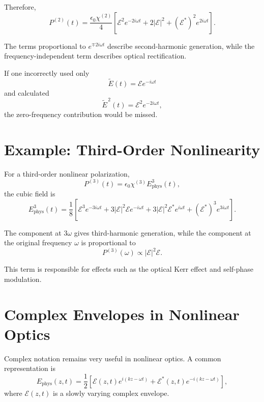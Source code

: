 \documentclass[11pt]{article}
\begin{document}
Therefore,
\begin{equation}
P^{(2)}(t)
=
\frac{\epsilon_0\chi^{(2)}}{4}
\left[
\mathcal{E}^2e^{-2i\omega t}
+
2|\mathcal{E}|^2
+
(\mathcal{E}^{*})^2e^{2i\omega t}
\right].
\end{equation}

The terms proportional to \(e^{\mp 2i\omega t}\) describe second-harmonic generation, while the frequency-independent term describes optical rectification.

If one incorrectly used only
\begin{equation}
\tilde{E}(t)
=
\mathcal{E}e^{-i\omega t}
\end{equation}
and calculated
\begin{equation}
\tilde{E}^{\,2}(t)
=
\mathcal{E}^2e^{-2i\omega t},
\end{equation}
the zero-frequency contribution would be missed.

\section{Example: Third-Order Nonlinearity}

For a third-order nonlinear polarization,
\begin{equation}
P^{(3)}(t)
=
\epsilon_0\chi^{(3)}
E_{\mathrm{phys}}^3(t),
\end{equation}
the cubic field is
\begin{equation}
E_{\mathrm{phys}}^3(t)
=
\frac{1}{8}
\left[
\mathcal{E}^3e^{-3i\omega t}
+
3|\mathcal{E}|^2\mathcal{E}e^{-i\omega t}
+
3|\mathcal{E}|^2\mathcal{E}^{*}e^{i\omega t}
+
(\mathcal{E}^{*})^3e^{3i\omega t}
\right].
\end{equation}

The component at \(3\omega\) gives third-harmonic generation, while the component at the original frequency \(\omega\) is proportional to
\begin{equation}
P^{(3)}(\omega)
\propto
|\mathcal{E}|^2\mathcal{E}.
\end{equation}

This term is responsible for effects such as the optical Kerr effect and self-phase modulation.

\section{Complex Envelopes in Nonlinear Optics}

Complex notation remains very useful in nonlinear optics. A common representation is
\begin{equation}
E_{\mathrm{phys}}(z,t)
=
\frac{1}{2}
\left[
\mathcal{E}(z,t)
e^{i(kz-\omega t)}
+
\mathcal{E}^{*}(z,t)
e^{-i(kz-\omega t)}
\right],
\end{equation}
where \(\mathcal{E}(z,t)\) is a slowly varying complex envelope.
\end{document}
